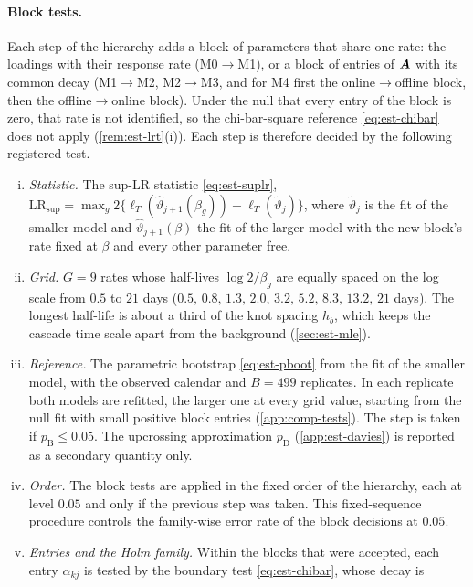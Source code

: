 \paragraph{Block tests.} Each step of the hierarchy adds a block of parameters that share
one rate: the loadings with their response rate (M0$\to$M1), or a block of entries of
$\bm{A}$ with its common decay (M1$\to$M2, M2$\to$M3, and for M4 first the online$\to$offline
block, then the offline$\to$online block). Under the null that every entry of the block is
zero, that rate is not identified, so the chi-bar-square reference
\eqref{eq:est-chibar} does not apply (\cref{rem:est-lrt}(i)). Each step is therefore decided
by the following registered test.
\begin{enumerate}[(i)]
  \item \emph{Statistic.} The sup-LR statistic \eqref{eq:est-suplr},
  $\mathrm{LR}_{\sup}=\max_g2\{\ell_T(\hat\vartheta_{j+1}(\beta_g))-\ell_T(\tilde\vartheta_j)\}$,
  where $\tilde\vartheta_j$ is the fit of the smaller model and
  $\hat\vartheta_{j+1}(\beta)$ the fit of the larger model with the new block's rate fixed
  at $\beta$ and every other parameter free.
  \item \emph{Grid.} $G=9$ rates whose half-lives $\log2/\beta_g$ are equally spaced on the
  log scale from $0.5$ to $21$ days ($0.5,\,0.8,\,1.3,\,2.0,\,3.2,\,5.2,\,8.3,\,13.2,\,21$
  days). The longest half-life is about a third of the knot spacing $h_b$, which keeps the
  cascade time scale apart from the background (\cref{sec:est-mle}).
  \item \emph{Reference.} The parametric bootstrap \eqref{eq:est-pboot} from the fit of the
  smaller model, with the observed calendar and $B=499$ replicates. In each replicate both
  models are refitted, the larger one at every grid value, starting from the null fit with
  small positive block entries (\cref{app:comp-tests}). The step is taken if
  $p_{\mathrm B}\le0.05$. The upcrossing approximation $p_{\mathrm D}$
  (\cref{app:est-davies}) is reported as a secondary quantity only.
  \item \emph{Order.} The block tests are applied in the fixed order of the hierarchy, each
  at level $0.05$ and only if the previous step was taken. This fixed-sequence procedure
  controls the family-wise error rate of the block decisions at $0.05$.
  \item \emph{Entries and the Holm family.} Within the blocks that were accepted, each entry
  $\alpha_{kj}$ is tested by the boundary test \eqref{eq:est-chibar}, whose decay is

\end{enumerate}
